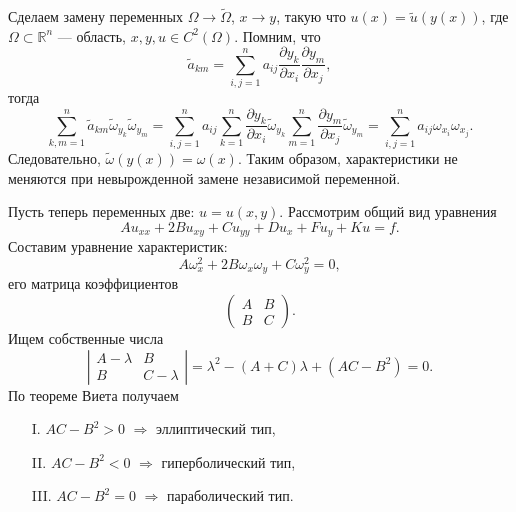 \documentclass[12pt,a5paper]{book}
\begin{document}
	Сделаем замену переменных $\Omega \rightarrow \tilde{\Omega}$, $x \rightarrow y$, такую что $u(x) = \tilde{u}(y(x))$, где $\Omega \subset \mathbb{R}^n$ --- область, $x, y, u \in C^2(\Omega)$. Помним, что
	\begin{equation*}
		\tilde{a}_{km} = \sum_{i,j=1}^{n}a_{ij}\frac{\partial y_k}{\partial x_i}\frac{\partial y_m}{\partial x_j},
	\end{equation*}
	тогда
	\begin{equation*}
		\sum_{k,m=1}^{n}\tilde{a}_{km}\tilde{\omega}_{y_k}\tilde{\omega}_{y_m} = \sum_{i,j=1}^{n}a_{ij} \sum_{k=1}^{n}\frac{\partial y_k}{\partial x_i}\tilde{\omega}_{y_k}\sum_{m=1}^{n}\frac{\partial y_m}{\partial x_j}\tilde{\omega}_{y_m} = \sum_{i,j=1}^{n}a_{ij}\omega_{x_i}\omega_{x_j}.
	\end{equation*}
	Следовательно, $\tilde{\omega}(y(x)) = \omega(x)$. Таким образом, характеристики не меняются при невырожденной замене независимой переменной.
	
	Пусть теперь переменных две: $u = u(x,y)$. Рассмотрим общий вид уравнения
	\begin{equation}\label{eq_xy}
		Au_{xx} + 2Bu_{xy} + Cu_{yy} + Du_x + Fu_y + Ku = f.
	\end{equation}
	Составим уравнение характеристик:
	\begin{equation}\label{eq_char_xy}
		A\omega^2_x + 2B\omega_x\omega_y + C\omega^2_y = 0,
	\end{equation}
	его матрица коэффициентов
	\begin{equation*}
		\begin{pmatrix}
			A & B \\
			B & C
		\end{pmatrix}.
	\end{equation*}
	Ищем собственные числа
	\begin{equation*}
		\left|\begin{matrix}
			A-\lambda & B \\
			B & C-\lambda
		\end{matrix}\right| = \lambda^2 - (A+C)\lambda + (AC - B^2) = 0.
	\end{equation*}
	По теореме Виета получаем
	\begin{itemize}
		\item [I.] $AC - B^2 > 0$ $\Rightarrow$ эллиптический тип,
		\item [II.] $AC - B^2 < 0$ $\Rightarrow$ гиперболический тип,
		\item [III.] $AC - B^2 = 0$ $\Rightarrow$ параболический тип.
	\end{itemize}
\end{document}
